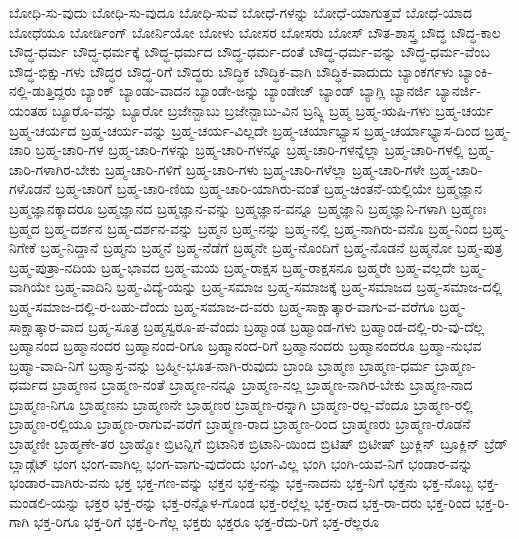 {ಬೋಧಿ-ಸು-ವುದು
ಬೋಧಿ-ಸು-ವುದೂ
ಬೋಧಿ-ಸುವೆ
ಬೋಧೆ-ಗಳನ್ನು
ಬೋಧೆ-ಯಾಗುತ್ತವೆ
ಬೋಧೆ-ಯಾದ
ಬೋಧೆಯೂ
ಬೋರ್ಡಿಂಗ್
ಬೋರ್ನಿಯೋ
ಬೋಳು
ಬೋಸರ
ಬೋಸರು
ಬೋಸ್
ಬೌತ-ಶಾಸ್ತ್ರ
ಬೌದ್ಧ
ಬೌದ್ಧ-ಕಾಲ
ಬೌದ್ಧ-ಧರ್ಮ
ಬೌದ್ಧ-ಧರ್ಮಕ್ಕೆ
ಬೌದ್ಧ-ಧರ್ಮದ
ಬೌದ್ಧ-ಧರ್ಮ-ದಂತೆ
ಬೌದ್ಧ-ಧರ್ಮ-ವನ್ನು
ಬೌದ್ಧ-ಧರ್ಮ-ವೆಂಬ
ಬೌದ್ಧ-ಭಿಕ್ಷು-ಗಳು
ಬೌದ್ಧರ
ಬೌದ್ಧ-ರಿಗೆ
ಬೌದ್ಧರು
ಬೌದ್ಧಿಕ
ಬೌದ್ಧಿಕ-ವಾಗಿ
ಬೌದ್ಧಿಕ-ವಾದುದು
ಬ್ಯಾಂಕರ್ಗಳು
ಬ್ಯಾಂಕಿ-ನಲ್ಲಿ-ಡುತ್ತಿದ್ದರು
ಬ್ಯಾಂಕ್
ಬ್ಯಾಂಡು-ವಾದನ
ಬ್ಯಾಂಡೇ-ಜನ್ನು
ಬ್ಯಾಂಡೇಜ್
ಬ್ಯಾಂಡ್
ಬ್ಯಾಗ್ಲಿ
ಬ್ಯಾನರ್ಜಿ
ಬ್ಯಾನರ್ಜಿ-ಯಂತಹ
ಬ್ಯೂರೊ-ವನ್ನು
ಬ್ಯೂರೋ
ಬ್ರಜೇನ್ಬಾಬು
ಬ್ರಜೇನ್ಬಾಬು-ವಿನ
ಬ್ರನ್ಕ್ಲಿ
ಬ್ರಹ್ಮ
ಬ್ರಹ್ಮ-ಋಷಿ-ಗಳು
ಬ್ರಹ್ಮ-ಚರ್ಯ
ಬ್ರಹ್ಮ-ಚರ್ಯದ
ಬ್ರಹ್ಮ-ಚರ್ಯ-ವನ್ನು
ಬ್ರಹ್ಮ-ಚರ್ಯ-ವಿಲ್ಲದೇ
ಬ್ರಹ್ಮ-ಚರ್ಯಾಭ್ಯಾಸ
ಬ್ರಹ್ಮ-ಚರ್ಯಾಭ್ಯಾಸ-ದಿಂದ
ಬ್ರಹ್ಮ-ಚಾರಿ
ಬ್ರಹ್ಮ-ಚಾರಿ-ಗಳ
ಬ್ರಹ್ಮ-ಚಾರಿ-ಗಳನ್ನು
ಬ್ರಹ್ಮ-ಚಾರಿ-ಗಳನ್ನೂ
ಬ್ರಹ್ಮ-ಚಾರಿ-ಗಳನ್ನೆಲ್ಲಾ
ಬ್ರಹ್ಮ-ಚಾರಿ-ಗಳಲ್ಲಿ
ಬ್ರಹ್ಮ-ಚಾರಿ-ಗಳಾಗಿರ-ಬೇಕು
ಬ್ರಹ್ಮ-ಚಾರಿ-ಗಳಿಗೆ
ಬ್ರಹ್ಮ-ಚಾರಿ-ಗಳು
ಬ್ರಹ್ಮ-ಚಾರಿ-ಗಳೆಲ್ಲಾ
ಬ್ರಹ್ಮ-ಚಾರಿ-ಗಳೇ
ಬ್ರಹ್ಮ-ಚಾರಿ-ಗಳೊಡನೆ
ಬ್ರಹ್ಮ-ಚಾರಿಗೆ
ಬ್ರಹ್ಮ-ಚಾರಿ-ಣಿಯ
ಬ್ರಹ್ಮ-ಚಾರಿ-ಯಾಗಿರು-ವಂತೆ
ಬ್ರಹ್ಮ-ಚಿಂತನೆ-ಯಲ್ಲಿಯೇ
ಬ್ರಹ್ಮಜ್ಞಾನ
ಬ್ರಹ್ಮಜ್ಞಾನಕ್ಕಾದರೂ
ಬ್ರಹ್ಮಜ್ಞಾನದ
ಬ್ರಹ್ಮಜ್ಞಾನ-ವನ್ನು
ಬ್ರಹ್ಮಜ್ಞಾನ-ವನ್ನೂ
ಬ್ರಹ್ಮಜ್ಞಾನಿ
ಬ್ರಹ್ಮಜ್ಞಾನಿ-ಗಳಾಗಿ
ಬ್ರಹ್ಮಣಃ
ಬ್ರಹ್ಮದ
ಬ್ರಹ್ಮ-ದರ್ಶನ
ಬ್ರಹ್ಮ-ದರ್ಶನ-ವನ್ನು
ಬ್ರಹ್ಮನ
ಬ್ರಹ್ಮ-ನನ್ನು
ಬ್ರಹ್ಮ-ನಲ್ಲಿ
ಬ್ರಹ್ಮ-ನಾಗಿರು-ವನೊ
ಬ್ರಹ್ಮ-ನಿಂದ
ಬ್ರಹ್ಮ-ನಿಗೇಕೆ
ಬ್ರಹ್ಮ-ನಿದ್ದಾನೆ
ಬ್ರಹ್ಮನು
ಬ್ರಹ್ಮನೆ
ಬ್ರಹ್ಮ-ನೆಡೆಗೆ
ಬ್ರಹ್ಮನೇ
ಬ್ರಹ್ಮ-ನೊಂದಿಗೆ
ಬ್ರಹ್ಮ-ನೊಡನೆ
ಬ್ರಹ್ಮನೋ
ಬ್ರಹ್ಮ-ಪುತ್ರ
ಬ್ರಹ್ಮ-ಪುತ್ರಾ-ನದಿಯ
ಬ್ರಹ್ಮ-ಭಾವದ
ಬ್ರಹ್ಮ-ಮಯ
ಬ್ರಹ್ಮ-ರಾಕ್ಷಸ
ಬ್ರಹ್ಮ-ರಾಕ್ಷಸನೂ
ಬ್ರಹ್ಮರೇ
ಬ್ರಹ್ಮ-ವಲ್ಲದೇ
ಬ್ರಹ್ಮ-ವಾಗಿಯೇ
ಬ್ರಹ್ಮ-ವಾದಿನಿ
ಬ್ರಹ್ಮ-ವಿದ್ಯೆ-ಯನ್ನು
ಬ್ರಹ್ಮ-ಸಮಾಜ
ಬ್ರಹ್ಮ-ಸಮಾಜಕ್ಕೆ
ಬ್ರಹ್ಮ-ಸಮಾಜದ
ಬ್ರಹ್ಮ-ಸಮಾಜ-ದಲ್ಲಿ
ಬ್ರಹ್ಮ-ಸಮಾಜ-ದಲ್ಲಿ-ರ-ಬಹು-ದೆಂದು
ಬ್ರಹ್ಮ-ಸಮಾಜ-ದ-ವರು
ಬ್ರಹ್ಮ-ಸಾಕ್ಷಾತ್ಕಾರ-ವಾಗು-ವ-ವರೆಗೂ
ಬ್ರಹ್ಮ-ಸಾಕ್ಷಾತ್ಕಾರ-ವಾದ
ಬ್ರಹ್ಮ-ಸೂತ್ರ
ಬ್ರಹ್ಮಸ್ವರೂ-ಪ-ವೆಂದು
ಬ್ರಹ್ಮಾಂಡ
ಬ್ರಹ್ಮಾಂಡ-ಗಳು
ಬ್ರಹ್ಮಾಂಡ-ದಲ್ಲಿ-ರು-ವು-ದೆಲ್ಲ
ಬ್ರಹ್ಮಾನಂದ
ಬ್ರಹ್ಮಾನಂದರ
ಬ್ರಹ್ಮಾನಂದ-ರಿಗೂ
ಬ್ರಹ್ಮಾನಂದ-ರಿಗೆ
ಬ್ರಹ್ಮಾನಂದರು
ಬ್ರಹ್ಮಾನಂದರೂ
ಬ್ರಹ್ಮಾ-ನುಭವ
ಬ್ರಹ್ಮಾ-ವಾದಿ-ನಿಗೆ
ಬ್ರಹ್ಮಾಸ್ರ-ವನ್ನು
ಬ್ರಹ್ಮೀ-ಭೂತ-ನಾಗಿ-ರುವುದು
ಬ್ರಾಂಡಿ
ಬ್ರಾಹ್ಮಣ
ಬ್ರಾಹ್ಮಣ-ಧರ್ಮ
ಬ್ರಾಹ್ಮಣ-ಧರ್ಮದ
ಬ್ರಾಹ್ಮಣನ
ಬ್ರಾಹ್ಮಣ-ನಂತೆ
ಬ್ರಾಹ್ಮಣ-ನನ್ನೂ
ಬ್ರಾಹ್ಮಣ-ನಲ್ಲ
ಬ್ರಾಹ್ಮಣ-ನಾಗಿರ-ಬೇಕು
ಬ್ರಾಹ್ಮಣ-ನಾದ
ಬ್ರಾಹ್ಮಣ-ನಿಗೂ
ಬ್ರಾಹ್ಮಣನು
ಬ್ರಾಹ್ಮಣನೇ
ಬ್ರಾಹ್ಮಣರ
ಬ್ರಾಹ್ಮಣ-ರನ್ನಾಗಿ
ಬ್ರಾಹ್ಮಣ-ರಲ್ಲ-ವೆಂದೂ
ಬ್ರಾಹ್ಮಣ-ರಲ್ಲಿ
ಬ್ರಾಹ್ಮಣ-ರಲ್ಲಿಯೂ
ಬ್ರಾಹ್ಮಣ-ರಾಗುವ-ವರೆಗೆ
ಬ್ರಾಹ್ಮಣ-ರಾದ
ಬ್ರಾಹ್ಮಣ-ರಿಂದ
ಬ್ರಾಹ್ಮಣರು
ಬ್ರಾಹ್ಮಣ-ರೊಡನೆ
ಬ್ರಾಹ್ಮಣೀ
ಬ್ರಾಹ್ಮಣೇ-ತರ
ಬ್ರಾಹ್ಮೋ
ಬ್ರಿಟನ್ನಿಗೆ
ಬ್ರಿಟಾನಿಕ
ಬ್ರಿಟಾನಿ-ಯಿಂದ
ಬ್ರಿಟಿಷ್
ಬ್ರಿಟೀಷ್
ಬ್ರುಕ್ಲಿನ್
ಬ್ರೂಕ್ಲಿನ್
ಬ್ರೆಡ್
ಬ್ಲಾಡ್ಗೆಟ್
ಭಂಗ
ಭಂಗ-ವಾಗಿಲ್ಲ
ಭಂಗ-ವಾಗು-ವುದೆಂದು
ಭಂಗ-ವಿಲ್ಲ
ಭಂಗಿ
ಭಂಗಿ-ಯವ-ನಿಗೆ
ಭಂಡಾರ-ವನ್ನು
ಭಂಡಾರ-ವಾಗಿರು-ವನು
ಭಕ್ತ
ಭಕ್ತ-ಗಣ-ವನ್ನು
ಭಕ್ತನ
ಭಕ್ತ-ನನ್ನು
ಭಕ್ತ-ನಾದನು
ಭಕ್ತ-ನಿಗೆ
ಭಕ್ತನು
ಭಕ್ತ-ನೊಬ್ಬ
ಭಕ್ತ-ಮಂಡಲಿ-ಯನ್ನು
ಭಕ್ತರ
ಭಕ್ತ-ರನ್ನು
ಭಕ್ತ-ರನ್ನೊಳ-ಗೊಂಡ
ಭಕ್ತ-ರಲ್ಲೆಲ್ಲ
ಭಕ್ತ-ರಾದ
ಭಕ್ತ-ರಾ-ದರು
ಭಕ್ತ-ರಿಂದ
ಭಕ್ತ-ರಿ-ಗಾಗಿ
ಭಕ್ತ-ರಿಗೂ
ಭಕ್ತ-ರಿಗೆ
ಭಕ್ತ-ರಿ-ಗೆಲ್ಲ
ಭಕ್ತರು
ಭಕ್ತರೂ
ಭಕ್ತ-ರೆದು-ರಿಗೆ
ಭಕ್ತ-ರೆಲ್ಲರೂ
}
